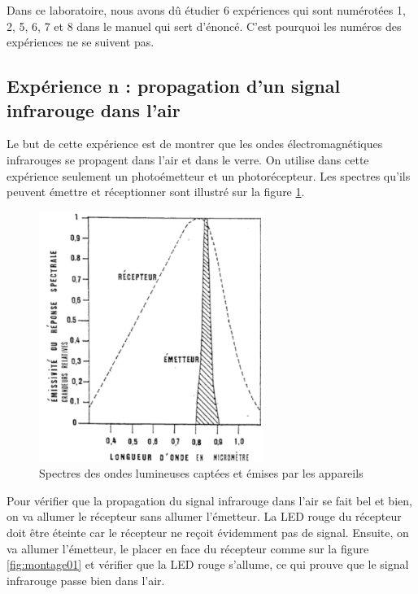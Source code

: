 \documentclass[a4paper]{article}
\begin{document}
Dans ce laboratoire, nous avons dû étudier 6 expériences qui sont numérotées 1, 2, 5, 6, 7 et 8 dans le manuel qui sert d'énoncé. C'est pourquoi les numéros des expériences ne se suivent pas.










\subsection{Expérience n : propagation d’un signal infrarouge dans l’air}





Le but de cette expérience est de montrer que les ondes électromagnétiques infrarouges se propagent dans l’air et dans le verre. On utilise dans cette expérience seulement un photoémetteur et un photorécepteur. Les spectres qu’ils peuvent émettre et réceptionner sont illustré sur la figure \ref{fig:spectresAppareils}.

\begin{figure}[H]
    \centering
    \includegraphics[width=0.65\textwidth]{images/spectres-appareils.PNG}
    \caption{Spectres des ondes lumineuses captées et émises par les appareils}
    \label{fig:spectresAppareils}
\end{figure}

Pour vérifier que la propagation du signal infrarouge dans l’air se fait bel et bien, on va allumer le récepteur sans allumer l’émetteur. La LED rouge du récepteur doit être éteinte car le récepteur ne reçoit évidemment pas de signal. Ensuite, on va allumer l’émetteur, le placer en face du récepteur comme sur la figure \ref{fig:montage01} et vérifier que la LED rouge s’allume, ce qui prouve que le signal infrarouge passe bien dans l’air.
\end{document}
